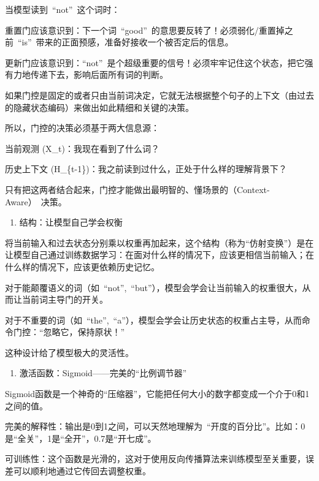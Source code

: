 当模型读到~``not''~这个词时：

重置门应该意识到：下一个词~``good''~的意思要反转了！必须弱化/重置掉之前~``is''~带来的正面预感，准备好接收一个被否定后的信息。

更新门应该意识到：``not''~是个超级重要的信号！必须牢牢记住这个状态，把它强有力地传递下去，影响后面所有词的判断。

如果门控是固定的或者只由当前词决定，它就无法根据整个句子的上下文（由过去的隐藏状态编码）来做出如此精细和关键的决策。

所以，门控的决策必须基于两大信息源：

当前观测 (X\_t)：我现在看到了什么词？

历史上下文 (H\_\{t-1\})：我之前读到过什么，正处于什么样的理解背景下？

只有把这两者结合起来，门控才能做出最明智的、懂场景的（Context-Aware）~决策。

\begin{enumerate}
\def\labelenumi{\arabic{enumi}.}
\setcounter{enumi}{1}
\tightlist
\item
  结构：让模型自己学会权衡
\end{enumerate}

将当前输入和过去状态分别乘以权重再加起来，这个结构（称为``仿射变换''）是在让模型自己通过训练数据学习：在面对什么样的情况下，应该更相信当前输入；在什么样的情况下，应该更依赖历史记忆。

对于能颠覆语义的词（如~``not'',~``but''），模型会学会让当前输入的权重很大，从而让当前词主导门的开关。

对于不重要的词（如~``the'',~``a''），模型会学会让历史状态的权重占主导，从而命令门控：``忽略它，保持原状！''

这种设计给了模型极大的灵活性。

\begin{enumerate}
\def\labelenumi{\arabic{enumi}.}
\setcounter{enumi}{2}
\tightlist
\item
  激活函数：Sigmoid------完美的``比例调节器''
\end{enumerate}

Sigmoid函数是一个神奇的``压缩器''，它能把任何大小的数字都变成一个介于0和1之间的值。

完美的解释性：输出是0到1之间，可以天然地理解为~``开度的百分比''。比如：0是``全关''，1是``全开''，0.7是``开七成''。

可训练性：这个函数是光滑的，这对于使用反向传播算法来训练模型至关重要，误差可以顺利地通过它传回去调整权重。

